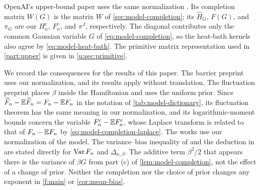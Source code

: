 OpenAI's upper-bound paper uses the same normalization
\cite[Section~2]{oai-typical-upper}. Its completion matrix $W(G)$ is the
matrix $W$ of \cref{sec:model-completion}; its $\widehat H_G$, $F(G)$, and
$\pi_G$ are our $H_n^c$, $F_n^c$, and $\pi^J$, respectively. The diagonal
contributes only the common Gaussian variable $G$ of
\eqref{eq:model-completion}, so the heat-bath kernels also agree by
\eqref{eq:model-heat-bath}. The primitive matrix representation used in
\cref{part:upper} is given in \cref{u:sec:primitive}.

We record the consequences for the results of this paper. The barrier preprint \cite{oai-barriers} uses our normalization, and its results apply without translation. The fluctuation preprint \cite{oai-fluctuations} places $\beta$ inside the Hamiltonian and uses the uniform prior. Since $\widetilde F_n-\mathbb E\widetilde F_n=F_n-\mathbb E F_n$ in the notation of \cref{tab:model-dictionary}, its fluctuation theorem has the same meaning in our normalization, and its logarithmic-moment bounds concern the variable $F_n^c-\mathbb E F_n^c$, whose Laplace transform is related to that of $F_n-\mathbb E F_n$ by \eqref{eq:model-completion-laplace}. The works \cite{quantitative-parisi,hexagon-bias} use our normalization of the model. The variance--bias inequality of \cite[Remark~7.14, (7.68)]{quantitative-parisi} and the deduction in \cite[Section~1.6]{hexagon-bias} are stated directly for $\operatorname{Var} F_n$ and $\Delta_{n,\beta}$. The additive term $\beta^2/2$ that appears there is the variance of $\beta G$ from part (c) of \cref{lem:model-completion}, not the effect of a change of prior. Neither the completion nor the choice of prior changes any exponent in \cref{f:main} or \cref{cor:mean-bias}.
